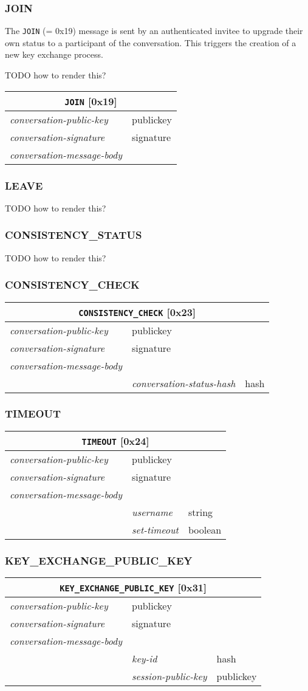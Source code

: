\documentclass{article}
\def\message#1{\texttt{#1}}
\def\field#1{\textit{#1}}
\newenvironment{conversationmessage}[2]{
\newcommand{\messagefield}[2]{
& \field{##1} & \textsf{##2} \\
\hline
}
\begin{tabular}{|l|l|l|}
\hline
\multicolumn{3}{|c|}{\message{#1} [#2]} \\
\hline
\hline
\field{conversation-public-key} & \multicolumn{2}{l|}{\textsf{publickey}} \\
\hline
\field{conversation-signature} & \multicolumn{2}{l|}{\textsf{signature}} \\
\hline
\field{conversation-message-body} & \multicolumn{2}{l|}{} \\
\hline
}{
\end{tabular}
}
\begin{document}
\subsubsection{JOIN}

The \message{JOIN} (= 0x19) message is sent by an authenticated invitee to upgrade their own status to a participant of the conversation.
This triggers the creation of a new key exchange process.

TODO how to render this?

\begin{conversationmessage}{JOIN}{0x19}
\end{conversationmessage}

\subsubsection{LEAVE}

TODO how to render this?

\subsubsection{CONSISTENCY\_STATUS}

TODO how to render this?

\subsubsection{CONSISTENCY\_CHECK}

\begin{conversationmessage}{CONSISTENCY\_CHECK}{0x23}
\messagefield{conversation-status-hash}{hash}
\end{conversationmessage}

\subsubsection{TIMEOUT}

\begin{conversationmessage}{TIMEOUT}{0x24}
\messagefield{username}{string}
\messagefield{set-timeout}{boolean}
\end{conversationmessage}

\subsubsection{KEY\_EXCHANGE\_PUBLIC\_KEY}

\begin{conversationmessage}{KEY\_EXCHANGE\_PUBLIC\_KEY}{0x31}
\messagefield{key-id}{hash}
\messagefield{session-public-key}{publickey}
\end{conversationmessage}
\end{document}
